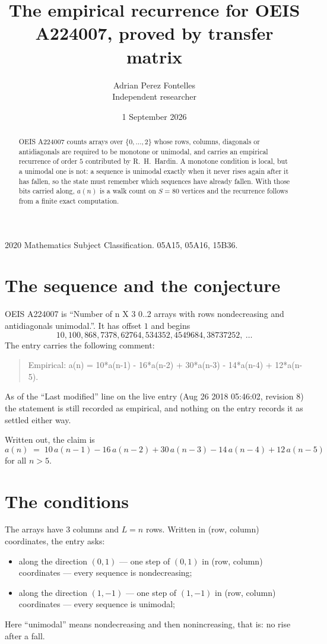 \documentclass[11pt,a4paper]{article}
\title{The empirical recurrence for OEIS A224007, proved by transfer matrix}
\author{Adrian Perez Fontelles\\ \small Independent researcher}
\date{1 September 2026}
\theoremstyle{plain}
\theoremstyle{definition}
\begin{document}
\maketitle

\begin{abstract}
OEIS A224007 counts arrays over $\{0,\dots,2\}$ whose rows, columns, diagonals or
antidiagonals are required to be monotone or unimodal, and carries an empirical recurrence of
order $5$ contributed by R.~H.~Hardin. A monotone condition is local, but a unimodal one
is not: a sequence is unimodal exactly when it never rises again after it has fallen, so the
state must remember which sequences have already fallen. With those bits carried along, $a(n)$
is a walk count on $S=80$ vertices and the recurrence follows from a finite exact
computation.
\end{abstract}

\noindent\small 2020 Mathematics Subject Classification. 05A15, 05A16, 15B36.\normalsize

\section{The sequence and the conjecture}

OEIS A224007 is ``Number of n X 3 0..2 arrays with rows nondecreasing and antidiagonals unimodal.''. It has offset $1$ and begins
\[
10, 100, 868, 7378, 62764, 534352, 4549684, 38737252,\ \dots
\]
The entry carries the following comment:
\begin{quote}\small
Empirical: a(n) = 10*a(n-1) - 16*a(n-2) + 30*a(n-3) - 14*a(n-4) + 12*a(n-5).
\end{quote}
As of the ``Last modified'' line on the live entry (Aug 26 2018 05:46:02, revision 8) the statement is
still recorded as empirical, and nothing on the entry records it as settled either way.

Written out, the claim is
\begin{equation}\label{eq:conj}
a(n)\;=\;10\,a(n-1) - 16\,a(n-2) + 30\,a(n-3) - 14\,a(n-4) + 12\,a(n-5)
\end{equation}
for all $n>5$.

\section{The conditions}

The arrays have $3$ columns and $L=n$ rows. Written in (row, column)
coordinates, the entry asks:
\begin{itemize}
\item along the direction $(0,1)$ --- one step of $(0,1)$ in (row, column) coordinates --- every sequence is nondecreasing;
\item along the direction $(1,-1)$ --- one step of $(1,-1)$ in (row, column) coordinates --- every sequence is unimodal;
\end{itemize}
Here ``unimodal'' means nondecreasing and then nonincreasing, that is: no rise after a fall.
\end{document}

